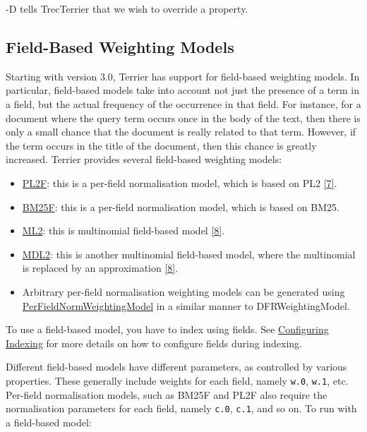 -D tells TrecTerrier that we wish to override a property.

\href{}{}

\subsection{Field-Based Weighting
Models}\label{field-based-weighting-models}

Starting with version 3.0, Terrier has support for field-based weighting
models. In particular, field-based models take into account not just the
presence of a term in a field, but the actual frequency of the
occurrence in that field. For instance, for a document where the query
term occurs once in the body of the text, then there is only a small
chance that the document is really related to that term. However, if the
term occurs in the title of the document, then this chance is greatly
increased. Terrier provides several field-based weighting models:

\begin{itemize}
\tightlist
\item
  \href{javadoc/org/terrier/matching/models/PL2F.html}{PL2F}: this is a
  per-field normalisation model, which is based on PL2
  \protect\hyperlink{cite7}{{[}7{]}}.
\item
  \href{javadoc/org/terrier/matching/models/BM25F.html}{BM25F}: this is
  a per-field normalisation model, which is based on BM25.
\item
  \href{javadoc/org/terrier/matching/models/ML2.html}{ML2}: this is
  multinomial field-based model \protect\hyperlink{cite8}{{[}8{]}}.
\item
  \href{javadoc/org/terrier/matching/models/MDL2.html}{MDL2}: this is
  another multinomial field-based model, where the multinomial is
  replaced by an approximation \protect\hyperlink{cite8}{{[}8{]}}.
\item
  Arbitrary per-field normalisation weighting models can be generated
  using
  \href{javadoc/org/terrier/matching/models/PerFieldNormWeightingModel.html}{PerFieldNormWeightingModel}
  in a similar manner to DFRWeightingModel.
\end{itemize}

To use a field-based model, you have to index using fields. See
\href{configure_indexing.html}{Configuring Indexing} for more details on
how to configure fields during indexing.

Different field-based models have different parameters, as controlled by
various properties. These generally include weights for each field,
namely \texttt{w.0}, \texttt{w.1}, etc. Per-field normalisation models,
such as BM25F and PL2F also require the normalisation parameters for
each field, namely \texttt{c.0}, \texttt{c.1}, and so on. To run with a
field-based model:

